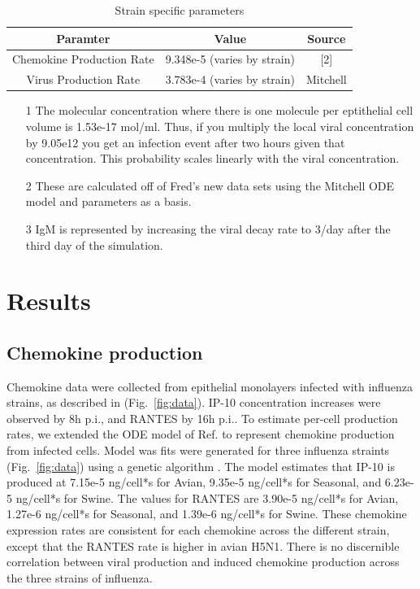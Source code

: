 \documentclass[10pt]{article}
\begin{document}
\begin{table}
\begin{tabular}{ | c | c | c | }
  \hline                        
  Paramter & Value & Source \\
  \hline
  Chemokine Production Rate &  9.348e-5 (varies by strain) & [2] \\
  Virus Production Rate &  3.783e-4 (varies by strain) & Mitchell \\
  \hline  
\end{tabular}
\caption{Strain specific parameters}
\label{table:strains}
\end{table}

\begin{itemize}
\item[1] The molecular concentration where there is one molecule per eptithelial cell volume is 1.53e-17 mol/ml.  Thus, if you multiply the local viral concentration by 9.05e12 you get an infection event after two hours given that concentration.  This probability scales linearly with the viral concentration.
\item[2] These are calculated off of Fred's new data sets using the Mitchell ODE model and parameters as a basis.
\item[3] IgM is represented by increasing the viral decay rate to 3/day after the third day of the simulation.
\end{itemize}


\section*{Results}

\subsection*{Chemokine production}

Chemokine data were collected from epithelial monolayers infected with influenza strains, as described in \cite{MitchellEtAl2011} (Fig.~\ref{fig:data}).  IP-10 concentration increases were observed by 8h p.i., and RANTES by 16h p.i..  To estimate per-cell production rates, we extended the ODE model of Ref. \cite{MitchellEtAl2011} to represent chemokine production from infected cells.  Model was fits were generated for three influenza straints (Fig.~\ref{fig:data}) using a genetic algorithm \cite{GA-ref}.  The model estimates that IP-10 is produced at 7.15e-5 ng/cell*s for Avian, 9.35e-5 ng/cell*s for Seasonal, and 6.23e-5 ng/cell*s for Swine.  The values for RANTES are 3.90e-5 ng/cell*s for Avian, 1.27e-6 ng/cell*s for Seasonal, and 1.39e-6 ng/cell*s for Swine.  These chemokine expression rates are consistent for each chemokine across the different strain, except that the RANTES rate is higher in avian H5N1.  There is no discernible correlation between viral production and induced chemokine production across the three strains of influenza.
\end{document}

